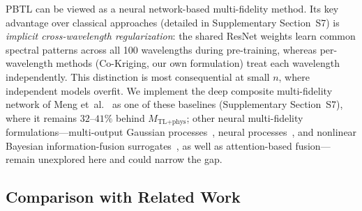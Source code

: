 \documentclass[a4paper,fleqn]{cas-sc}
\newcommand{\Mtlphys}{M_\text{TL+phys}}
\begin{document}
PBTL can be viewed as a neural network-based multi-fidelity method. Its key advantage over classical approaches (detailed in Supplementary Section~S7) is \emph{implicit cross-wavelength regularization}: the shared ResNet weights learn common spectral patterns across all 100 wavelengths during pre-training, whereas per-wavelength methods (Co-Kriging, our own formulation) treat each wavelength independently. This distinction is most consequential at small $n$, where independent models overfit. We implement the deep composite multi-fidelity network of Meng et~al.~\cite{meng2020composite} as one of these baselines (Supplementary Section~S7), where it remains $32$--$41\%$ behind $\Mtlphys$; other neural multi-fidelity formulations---multi-output Gaussian processes~\cite{bonilla2007multitask}, neural processes~\cite{garnelo2018cnp}, and nonlinear Bayesian information-fusion surrogates~\cite{perdikaris2017nonlinear}, as well as attention-based fusion---remain unexplored here and could narrow the gap.

\subsection{Comparison with Related Work}
\label{sec:related_comparison}
\end{document}
